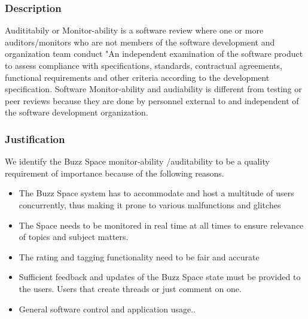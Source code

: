 
	\subsubsection*{Description}
		Audititabily or Monitor-ability is a software review where one or more auditors/monitors who are not members of the software development and organization team conduct "An independent examination of the software product to assess compliance with specifications, standards, contractual agreements, functional requirements and other criteria according to the development specification. Software Monitor-ability and audiability is different from testing or peer reviews because they are done by personnel external to and independent of the software development organization.
	\subsubsection*{Justification}
	We identify the Buzz Space monitor-ability /auditability to be a quality requirement of importance because of the following reasons.
	
				
					\begin{itemize}
							\item The Buzz Space system has to accommodate and host a multitude of users concurrently, thus making it prone to various malfunctions and glitches
							
							\item The Space needs to be monitored in real time at all times to ensure relevance of topics and subject matters.
							\item The rating and tagging functionality need to be fair and accurate
							
							\item Sufficient feedback and updates of the Buzz Space state must be provided to the users. Users that create threads or just comment on one.
							
							\item General software control and application usage..
						 \end{itemize}
	
	
	
